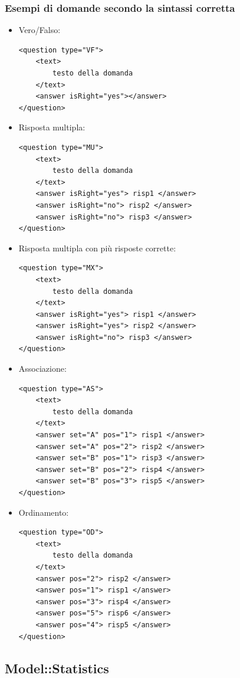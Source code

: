 \subsubsection{Esempi di domande secondo la sintassi corretta}
\begin{itemize}
\item Vero/Falso:\\
\begin{lstlisting}
<question type="VF">
	<text>
		testo della domanda
	</text>
	<answer isRight="yes"></answer>
</question>
\end{lstlisting}
\item Risposta multipla:\\
\begin{lstlisting}
<question type="MU">
    <text>
    	testo della domanda
    </text>
    <answer isRight="yes"> risp1 </answer>
    <answer isRight="no"> risp2 </answer>
    <answer isRight="no"> risp3 </answer>
</question>
\end{lstlisting}
\item Risposta multipla con più risposte corrette:
\begin{lstlisting}
<question type="MX"> 
	<text>
    	testo della domanda
    </text>
    <answer isRight="yes"> risp1 </answer>
    <answer isRight="yes"> risp2 </answer>
    <answer isRight="no"> risp3 </answer>
</question>
\end{lstlisting}
\item Associazione:
\begin{lstlisting}
<question type="AS"> 
	<text>
    	testo della domanda
    </text>
    <answer set="A" pos="1"> risp1 </answer>
    <answer set="A" pos="2"> risp2 </answer>
    <answer set="B" pos="1"> risp3 </answer>
    <answer set="B" pos="2"> risp4 </answer>
    <answer set="B" pos="3"> risp5 </answer>
</question>
\end{lstlisting}
\item Ordinamento:
\begin{lstlisting}
<question type="OD">
	<text>
    	testo della domanda
    </text>
	<answer pos="2"> risp2 </answer>    
    <answer pos="1"> risp1 </answer>
    <answer pos="3"> risp4 </answer>
    <answer pos="5"> risp6 </answer>
    <answer pos="4"> risp5 </answer>
</question>
\end{lstlisting}
\end{itemize}
\newpage

\subsection{Model::Statistics}
